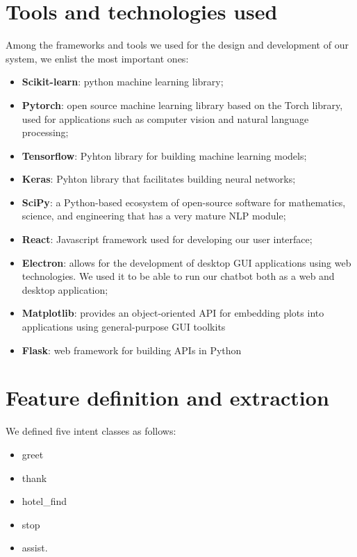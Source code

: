 \documentclass[runningheads,a4paper,11pt]{report}
\begin{document}
\section{Tools and technologies used}
\label{section:tools}

Among the frameworks and tools we used for the design and development of our system, we enlist the most important ones:
\begin{itemize}
	\item \textbf{Scikit-learn}: python machine learning library;
	\item \textbf{Pytorch}: open source machine learning library based on the Torch library, used for applications such as computer vision and natural language processing;
	\item \textbf{Tensorflow}: Pyhton library for building machine learning models;
	\item \textbf{Keras}:  Pyhton library that facilitates building neural networks;
	\item \textbf{SciPy}: a Python-based ecosystem of open-source software for mathematics, science, and engineering that has a very mature NLP module;
	\item \textbf{React}: Javascript framework used for developing our user interface;
	\item \textbf{Electron}: allows for the development of desktop GUI applications using web technologies. We used it to be able to run our chatbot both as a web and desktop application;
	\item \textbf{Matplotlib}: provides an object-oriented API for embedding plots into applications using general-purpose GUI toolkits
	\item \textbf{Flask}: web framework for building APIs in Python
\end{itemize}

\section{Feature definition and extraction}
\label{section:features}

We defined five intent classes as follows: 
\begin{itemize}
	\item greet
	\item thank
	\item hotel\_find
	\item stop
	\item assist.
\end{itemize}
\end{document}
